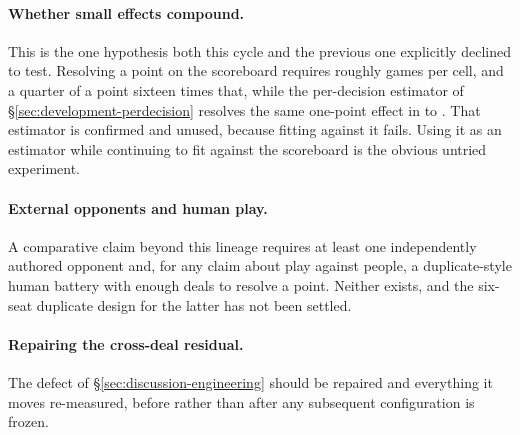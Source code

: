 \paragraph{Whether small effects compound.} This is the one hypothesis both this cycle and the
previous one explicitly declined to test. Resolving a point on the scoreboard requires roughly
\vsevenScoreboardGames{} games per cell, and a quarter of a point sixteen times that, while the
per-decision estimator of \S\ref{sec:development-perdecision} resolves the same one-point effect in
\vsevenPerDecisionGamesLo{} to \vsevenPerDecisionGamesHi{}. That estimator is confirmed and unused,
because fitting against it fails. Using it as an estimator while continuing to fit against the
scoreboard is the obvious untried experiment.

\paragraph{External opponents and human play.} A comparative claim beyond this lineage requires at
least one independently authored opponent and, for any claim about play against people, a
duplicate-style human battery with enough deals to resolve a point. Neither exists, and the six-seat
duplicate design for the latter has not been settled.

\paragraph{Repairing the cross-deal residual.} The defect of \S\ref{sec:discussion-engineering} should
be repaired and everything it moves re-measured, before rather than after any subsequent
configuration is frozen.
